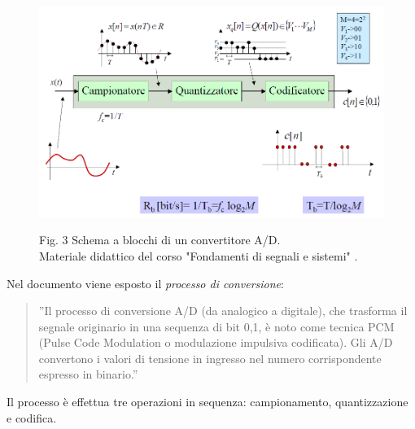 \documentclass[a4paper]{report} %
\begin{document}
 
\begin{figure}
	\centering
	\includegraphics[scale=.4]{Immagini/schemaAD.png}
	
	Fig. 3 Schema a blocchi di un convertitore A/D. \\
	Materiale didattico del corso "Fondamenti di segnali e sistemi" \cite{art:rif.7}.
\end{figure}

Nel documento \cite{art:rif.7} viene esposto il \textit{processo di conversione}: 
\begin{quote}
	''Il processo di conversione A/D (da analogico a digitale), che trasforma il segnale originario in una sequenza di bit {0,1}, è noto come tecnica PCM (Pulse Code Modulation o modulazione impulsiva codificata). Gli A/D convertono i valori di tensione in ingresso nel numero corrispondente espresso in binario.''
\end{quote}
Il processo è effettua tre operazioni in sequenza: campionamento, quantizzazione e codifica. 
 
\end{document}
